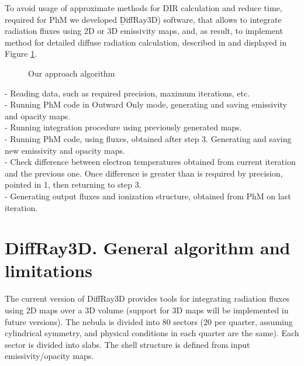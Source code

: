\documentclass[a4paper]{article}
\begin{document}
To avoid usage of approximate methods for DIR calculation and reduce time, 
required for PhM we developed {\b DiffRay3D}) software, that allows to integrate
radiation fluxes using 2D or 3D emissivity maps, and, as result, to implement 
method for detailed diffuse radiation calculation, described in \cite{JPS2016}
and displayed in Figure \ref{our_approach}.

\begin{figure}[!h]
\centering
\begin{minipage}[t]{.45\linewidth}
\centering
{}
\caption{Our approach algorithm}\label{our_approach}
\end{minipage}
\hfill
\end{figure}

 - Reading data, such as required precision, maximum iterations, etc.\\
 - Running PhM code in Outward Only mode, generating and saving emissivity and opacity maps.\\
 - Running integration procedure using previously generated maps.\\
 - Running PhM code, using fluxes, obtained after step 3. Generating and saving new emissivity and opacity maps.\\
 - Check difference between electron temperatures obtained from current iteration and the previous one. Once difference is greater than is required by precision, pointed in 1, then returning to step 3.\\
 - Generating output fluxes and ionization structure, obtained from PhM on last iteration.\\


\section{DiffRay3D. General algorithm and limitations}

The current version of DiffRay3D provides tools for integrating radiation fluxes using 2D maps over a 3D volume
(support for 3D maps will be implemented in future versions). The nebula is divided into 80 sectors
(20 per quarter, assuming cylindrical symmetry, and physical conditions in each quarter are the same).
Each sector is divided into slabs. The shell structure is defined from input emissivity/opacity maps.
\end{document}
